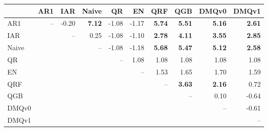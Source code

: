 \begin{tabular}{lrrrrrrrrr}
\toprule
 & AR1 & IAR & Naive & QR & EN & QRF & QGB & DMQv0 & DMQv1 \\
\midrule
AR1 & -- & -0.20 & \textbf{7.12} & -1.08 & -1.17 & \textbf{5.74} & \textbf{5.51} & \textbf{5.16} & \textbf{2.61} \\
IAR &  & -- & 0.25 & -1.08 & -1.10 & \textbf{2.78} & \textbf{4.11} & \textbf{3.55} & \textbf{2.85} \\
Naive &  &  & -- & -1.08 & -1.18 & \textbf{5.68} & \textbf{5.47} & \textbf{5.12} & \textbf{2.58} \\
QR &  &  &  & -- & 1.08 & 1.08 & 1.08 & 1.08 & 1.08 \\
EN &  &  &  &  & -- & 1.53 & 1.65 & 1.70 & 1.59 \\
QRF &  &  &  &  &  & -- & \textbf{3.63} & \textbf{2.16} & 0.72 \\
QGB &  &  &  &  &  &  & -- & 0.10 & -0.64 \\
DMQv0 &  &  &  &  &  &  &  & -- & -0.61 \\
DMQv1 &  &  &  &  &  &  &  &  & -- \\
\bottomrule
\end{tabular}
